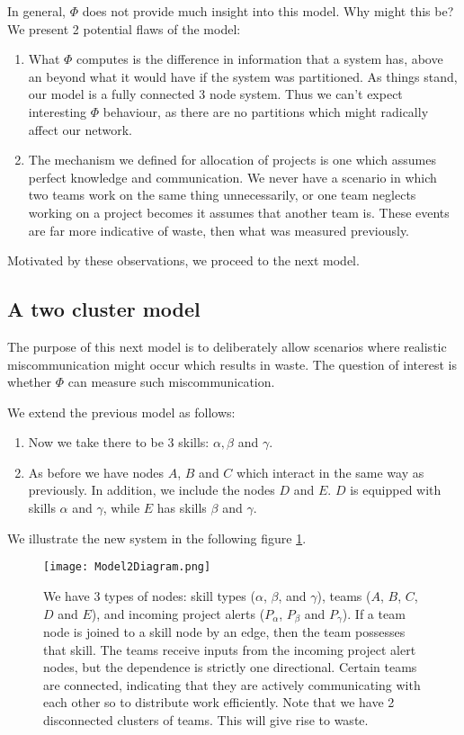 In general, $\Phi$ does not provide much insight into this model. Why might this be? We present 2 potential flaws of the model:

\begin{enumerate}
	\item What $\Phi$ computes is the difference in information that a system has, above an beyond what it would have if the system was partitioned. As things stand, our model is a fully connected 3 node system. Thus we can't expect interesting $\Phi$ behaviour, as there are no partitions which might radically affect our network. 

	\item The mechanism we defined for allocation of projects is one which assumes perfect knowledge and communication. We never have a scenario in which two teams work on the same thing unnecessarily, or one team neglects working on a project becomes it assumes that another team is. These events are far more indicative of waste, then what was measured previously. 

\end{enumerate}

Motivated by these observations, we proceed to the next model.



\subsection{A two cluster model}

The purpose of this next model is to deliberately allow scenarios where realistic miscommunication might occur which results in waste. The question of interest is whether $\Phi$ can measure such miscommunication.

We extend the previous model as follows: 
\begin{enumerate}
	\item Now we take there to be 3 skills: $\alpha, \beta$ and $\gamma$.
	
	\item As before we have nodes $A$, $B$ and $C$ which interact in the same way as previously. In addition, we include the nodes $D$ and $E$. $D$ is equipped with skills $\alpha$ and $\gamma$, while $E$ has skills $\beta$ and $\gamma$. 
\end{enumerate}

We illustrate the new system in the following figure \ref{fig:diagram2}.
\begin{figure}[h]
	\centering	
	\texttt{[image: Model2Diagram.png]}
	\caption{We have 3 types of nodes: skill types ($\alpha$, $\beta$, and $\gamma$), teams ($A$, $B$, $C$, $D$ and $E$), and incoming project alerts ($P_\alpha$, $P_\beta$ and $P_\gamma$). If a team node is joined to a skill node by an edge, then the team possesses that skill. The teams receive inputs from the incoming project alert nodes, but the dependence is strictly one directional.
	Certain teams are connected, indicating that they are actively communicating with each other so to distribute work efficiently. Note that we have 2 disconnected clusters of teams. This will give rise to waste.}
	\label{fig:diagram2}
\end{figure}

